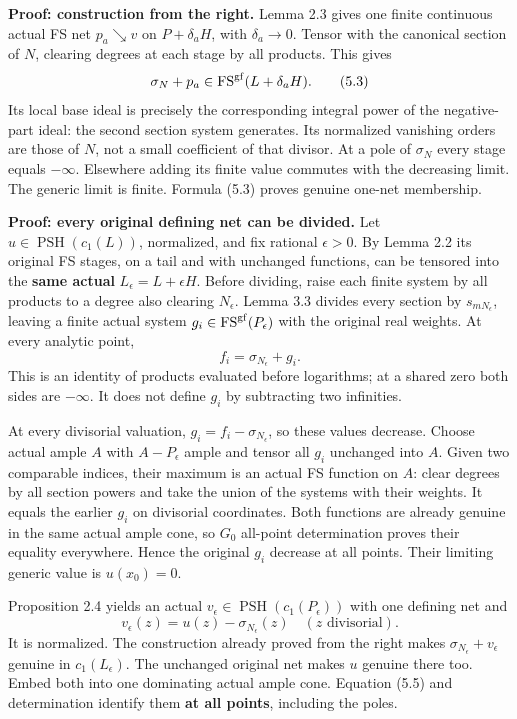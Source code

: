 \documentclass[
  10pt,
]{article}
\begin{document}
\textbf{Proof: construction from the right.} Lemma 2.3 gives one finite
continuous actual FS net \(p_a\searrow v\) on \(P+\delta_aH\), with
\(\delta_a\to0\). Tensor with the canonical section of \(N\), clearing
degrees at each stage by all products. This gives \[
 \sigma_N+p_a\in\operatorname{FS}^{\rm gf}(L+\delta_aH).         \tag{5.3}
\] Its local base ideal is precisely the corresponding integral power of
the negative-part ideal: the second section system generates. Its
normalized vanishing orders are those of \(N\), not a small coefficient
of that divisor. At a pole of \(\sigma_N\) every stage equals
\(-\infty\). Elsewhere adding its finite value commutes with the
decreasing limit. The generic limit is finite. Formula (5.3) proves
genuine one-net membership.

\textbf{Proof: every original defining net can be divided.} Let
\(u\in\operatorname{PSH}(c_1(L))\), normalized, and fix rational
\(\epsilon>0\). By Lemma 2.2 its original FS stages, on a tail and with
unchanged functions, can be tensored into the \textbf{same actual}
\(L_\epsilon=L+\epsilon H\). Before dividing, raise each finite system
by all products to a degree also clearing \(N_\epsilon\). Lemma 3.3
divides every section by \(s_{mN_\epsilon}\), leaving a finite actual
system \(g_i\in\operatorname{FS}^{\rm gf}(P_\epsilon)\) with the
original real weights. At every analytic point, \[
 f_i=\sigma_{N_\epsilon}+g_i.                                  \tag{5.4}
\] This is an identity of products evaluated before logarithms; at a
shared zero both sides are \(-\infty\). It does not define \(g_i\) by
subtracting two infinities.

At every divisorial valuation, \(g_i=f_i-\sigma_{N_\epsilon}\), so these
values decrease. Choose actual ample \(A\) with \(A-P_\epsilon\) ample
and tensor all \(g_i\) unchanged into \(A\). Given two comparable
indices, their maximum is an actual FS function on \(A\): clear degrees
by all section powers and take the union of the systems with their
weights. It equals the earlier \(g_i\) on divisorial coordinates. Both
functions are already genuine in the same actual ample cone, so \(G_0\)
all-point determination proves their equality everywhere. Hence the
original \(g_i\) decrease at all points. Their limiting generic value is
\(u(x_0)=0\).

Proposition 2.4 yields an actual
\(v_\epsilon\in\operatorname{PSH}(c_1(P_\epsilon))\) with one defining
net and \[
 v_\epsilon(z)=u(z)-\sigma_{N_\epsilon}(z)
                     \quad(z\text{ divisorial}).               \tag{5.5}
\] It is normalized. The construction already proved from the right
makes \(\sigma_{N_\epsilon}+v_\epsilon\) genuine in \(c_1(L_\epsilon)\).
The unchanged original net makes \(u\) genuine there too. Embed both
into one dominating actual ample cone. Equation (5.5) and determination
identify them \textbf{at all points}, including the poles.
\end{document}
